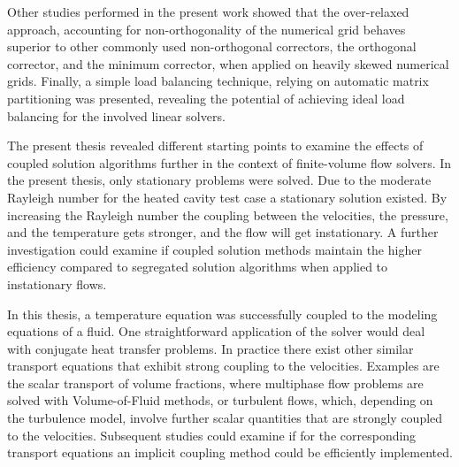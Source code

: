 Other studies performed in the present work showed that the over-relaxed approach, accounting for non-orthogonality of the numerical grid behaves superior to other commonly used non-orthogonal correctors, the orthogonal corrector, and the minimum corrector, when applied on heavily skewed numerical grids.  Finally, a simple load balancing technique, relying on automatic matrix partitioning was presented, revealing the potential of achieving ideal load balancing for the involved linear solvers.

The present thesis revealed different starting points to examine the effects of coupled solution algorithms further in the context of finite-volume flow solvers. In the present thesis, only stationary problems were solved. Due to the moderate Rayleigh number for the heated cavity test case a stationary solution existed. By increasing the Rayleigh number the coupling between the velocities, the pressure, and the temperature gets stronger, and the flow will get instationary. A further investigation could examine if coupled solution methods maintain the higher efficiency compared to segregated solution algorithms when applied to instationary flows.

In this thesis, a temperature equation was successfully coupled to the modeling equations of a fluid. One straightforward application of the solver would deal with conjugate heat transfer problems. In practice there exist other similar transport equations that exhibit strong coupling to the velocities. Examples are the scalar transport of volume fractions, where multiphase flow problems are solved with Volume-of-Fluid methods, or turbulent flows, which, depending on the turbulence model, involve further scalar quantities that are strongly coupled to the velocities. Subsequent studies could examine if for the corresponding transport equations an implicit coupling method could be efficiently implemented.

